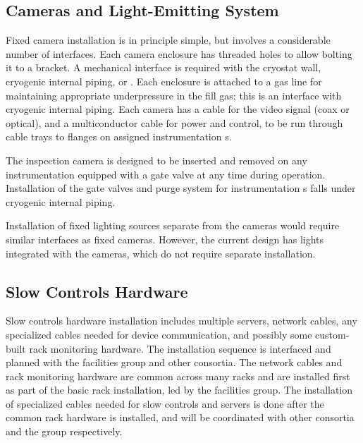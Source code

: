 \subsection{Cameras and Light-Emitting System}
\label{sec:fdgen-slow-cryo-install-c}

Fixed camera installation is in principle simple, but involves a
considerable number of interfaces. Each camera enclosure has 
threaded holes to allow bolting it to a bracket. A mechanical
interface is required with the cryostat wall, cryogenic internal
piping, or . Each enclosure is attached
to a gas line for maintaining appropriate underpressure in the fill
gas; this is an interface with cryogenic internal piping. Each camera has a
cable for the video signal (coax or optical), and a multiconductor
cable for power and control, to be run through cable trays to flanges
on assigned instrumentation \fdth{}s.

The inspection camera is designed to be inserted and removed on any
instrumentation \fdth equipped with a gate valve at any time
during operation.  Installation of the gate valves and purge system
for instrumentation \fdth{}s falls under cryogenic internal
piping.

Installation of fixed lighting sources separate from the cameras would
require similar interfaces as fixed cameras.  However, the current
design has lights integrated with the cameras, which do not require separate
installation.



\subsection{Slow Controls Hardware}
\label{sec:fdgen-slow-cryo-install-sc-hard}

Slow controls hardware installation includes multiple
servers, network cables, any specialized cables needed
for device communication, and possibly some custom-built rack
monitoring hardware. The installation sequence is interfaced and
planned with the facilities group and other consortia. The network
cables and rack monitoring hardware are common across many racks
and are installed first as part of the basic rack installation, 
led by the facilities group. The installation of
specialized cables needed for slow controls and servers is done
after the common rack hardware is installed, and will be coordinated
with other consortia and the  group respectively.

